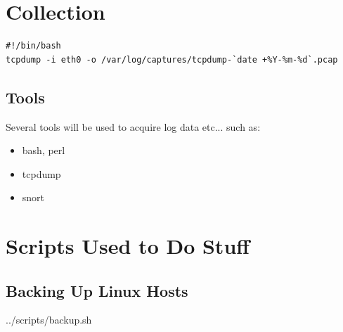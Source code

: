 \documentclass[11pt]{article}
\begin{document}
  \section{Collection}

    \begin{lstlisting}[caption={Collecting Data},
                       label={lst:collect_data}]
#!/bin/bash
tcpdump -i eth0 -o /var/log/captures/tcpdump-`date +%Y-%m-%d`.pcap
    \end{lstlisting}

    \subsection{Tools}
      \label{sec:tools}

      Several tools will be used to acquire log data etc... such as:

      \begin{itemize}
        \item bash, perl
        \item tcpdump
        \item snort
      \end{itemize}

  \newpage
  \addappheadtotoc
  \appendix
  \appendixpage

  \section{Scripts Used to Do Stuff}
    \label{app:scripts}

    \subsection{Backing Up Linux Hosts}
      \label{app:scripts:backup}

      
        {../scripts/backup.sh}
\end{document}
